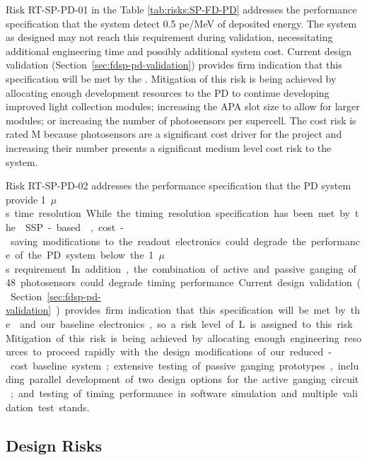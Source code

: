 Risk RT-SP-PD-01 in the Table \ref{tab:risks:SP-FD-PD} addresses the performance specification that the  system detect 0.5 pe/MeV of deposited energy.  The system as designed may not reach this requirement during validation, necessitating additional engineering time and possibly additional system cost.  Current design validation (Section~\ref{sec:fdsp-pd-validation}) 
provides firm indication that this specification will be met by the .  Mitigation of this risk is being achieved by allocating enough development resources to the PD to continue developing improved light collection modules; increasing the APA slot size to allow for larger modules; or increasing the number of photosensors per  supercell.  
The cost risk is rated M because photosensors are a significant cost driver for the project and increasing their number presents a significant medium level cost risk to the system.

Risk RT-SP-PD-02 addresses the performance specification that the PD system provide \SI{1}{$\mu$s} time resolution.  While the timing resolution specification has been met by the  SSP-based ,  cost-saving modifications to the readout electronics could degrade the performance of the PD system below the \SI{1}{$\mu$s} requirement.  In addition, the combination of active and passive ganging of 48 photosensors could degrade timing performance.  Current design validation (Section~\ref{sec:fdsp-pd-validation}) provides firm indication that this specification will be met by the  and our baseline electronics, so a risk level of L is assigned to this risk.  Mitigation of this risk is being achieved by allocating enough engineering resources to proceed rapidly with the design modifications of our reduced-cost baseline system; extensive testing of passive ganging prototypes, including parallel development of two design options for the active ganging circuit; and testing of timing performance in software simulation and multiple validation test stands.


\subsection{Design Risks}

